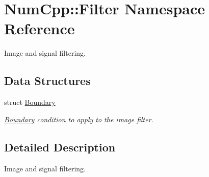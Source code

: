 \hypertarget{namespace_num_cpp_1_1_filter}{}\section{Num\+Cpp\+:\+:Filter Namespace Reference}
\label{namespace_num_cpp_1_1_filter}


Image and signal filtering.  


\subsection*{Data Structures}
\begin{DoxyCompactItemize}
\item 
struct \mbox{\hyperlink{struct_num_cpp_1_1_filter_1_1_boundary}{Boundary}}
\begin{DoxyCompactList}\small\item\em \mbox{\hyperlink{struct_num_cpp_1_1_filter_1_1_boundary}{Boundary}} condition to apply to the image filter. \end{DoxyCompactList}\end{DoxyCompactItemize}


\subsection{Detailed Description}
Image and signal filtering. 